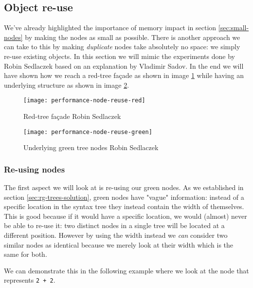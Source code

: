 \subsection{Object re-use}
\label{sec:object-reuse}

We've already highlighted the importance of memory impact in section \ref{sec:small-nodes} by making the nodes as small as possible. There is another approach we can take to this by making \textit{duplicate} nodes take absolutely no space: we simply re-use existing objects. In this section we will mimic the experiments done by Robin Sedlaczek\parencite{Sedlaczek2015} based on an explanation by Vladimir Sadov\parencite{Sadov2014}. In the end we will have shown how we reach a red-tree façade as shown in image \ref{img:performance-node-reuse-red} while having an underlying structure as shown in image \ref{img:performance-node-reuse-green}.

\begin{figure}[h]
\centering
\texttt{[image: performance-node-reuse-red]}
\caption[Red-tree façade]{Red-tree façade \textcopyright Robin Sedlaczek}
\label{img:performance-node-reuse-red}
\end{figure}

\begin{figure}[h]
\centering
\texttt{[image: performance-node-reuse-green]}
\caption[Underlying green tree nodes]{Underlying green tree nodes \textcopyright Robin Sedlaczek}
\label{img:performance-node-reuse-green}
\end{figure}

\subsubsection{Re-using nodes}
\label{sec:re-use-nodes}

The first aspect we will look at is re-using our green nodes. As we established in section \ref{sec:rg-trees-solution}, green nodes have "vague" information: instead of a specific location in the syntax tree they instead contain the width of themselves. This is good because if it would have a specific location, we would (almost) never be able to re-use it: two distinct nodes in a single tree will be located at a different position. However by using the width instead we \textit{can} consider two similar nodes as identical because we merely look at their width which is the same for both.

We can demonstrate this in the following example where we look at the node that represents \texttt{2 + 2}.

